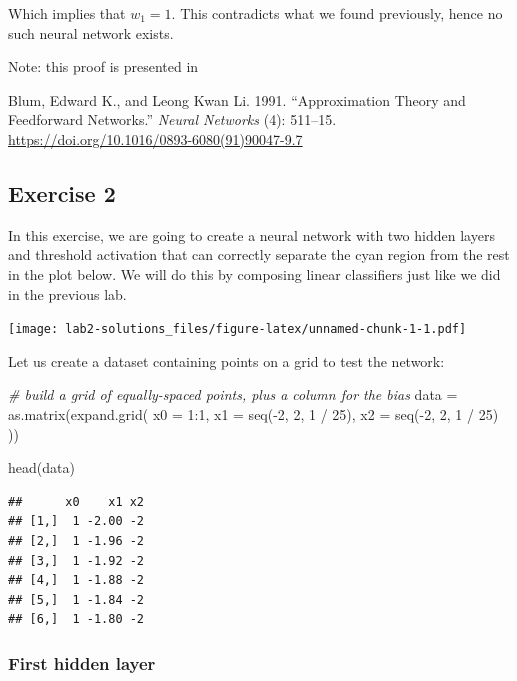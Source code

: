 \documentclass[
]{article}
\newenvironment{Shaded}{\begin{snugshade}}{\end{snugshade}}
\newcommand{\AttributeTok}[1]{\textcolor[rgb]{0.77,0.63,0.00}{#1}}
\newcommand{\CommentTok}[1]{\textcolor[rgb]{0.56,0.35,0.01}{\textit{#1}}}
\newcommand{\DecValTok}[1]{\textcolor[rgb]{0.00,0.00,0.81}{#1}}
\newcommand{\FunctionTok}[1]{\textcolor[rgb]{0.00,0.00,0.00}{#1}}
\newcommand{\NormalTok}[1]{#1}
\newcommand{\OtherTok}[1]{\textcolor[rgb]{0.56,0.35,0.01}{#1}}
\newcommand{\SpecialCharTok}[1]{\textcolor[rgb]{0.00,0.00,0.00}{#1}}
\begin{document}
Which implies that \(w_1=1\). This contradicts what we found previously,
hence no such neural network exists.

Note: this proof is presented in

Blum, Edward K., and Leong Kwan Li. 1991. ``Approximation Theory and
Feedforward Networks.'' \emph{Neural Networks} (4): 511--15.
\url{https://doi.org/10.1016/0893-6080(91)90047-9.7}

\hypertarget{exercise-2}{%
\subsection{Exercise 2}\label{exercise-2}}

In this exercise, we are going to create a neural network with two
hidden layers and threshold activation that can correctly separate the
cyan region from the rest in the plot below. We will do this by
composing linear classifiers just like we did in the previous lab.

\texttt{[image: lab2-solutions\_files/figure-latex/unnamed-chunk-1-1.pdf]}

Let us create a dataset containing points on a grid to test the network:

\begin{Shaded}
\begin{Highlighting}[]
\CommentTok{\# build a grid of equally{-}spaced points, plus a column for the bias}
\NormalTok{data }\OtherTok{=} \FunctionTok{as.matrix}\NormalTok{(}\FunctionTok{expand.grid}\NormalTok{(}
  \AttributeTok{x0 =} \DecValTok{1}\SpecialCharTok{:}\DecValTok{1}\NormalTok{,}
  \AttributeTok{x1 =} \FunctionTok{seq}\NormalTok{(}\SpecialCharTok{{-}}\DecValTok{2}\NormalTok{, }\DecValTok{2}\NormalTok{, }\DecValTok{1} \SpecialCharTok{/} \DecValTok{25}\NormalTok{),}
  \AttributeTok{x2 =} \FunctionTok{seq}\NormalTok{(}\SpecialCharTok{{-}}\DecValTok{2}\NormalTok{, }\DecValTok{2}\NormalTok{, }\DecValTok{1} \SpecialCharTok{/} \DecValTok{25}\NormalTok{)}
\NormalTok{))}

\FunctionTok{head}\NormalTok{(data)}
\end{Highlighting}
\end{Shaded}

\begin{verbatim}
##      x0    x1 x2
## [1,]  1 -2.00 -2
## [2,]  1 -1.96 -2
## [3,]  1 -1.92 -2
## [4,]  1 -1.88 -2
## [5,]  1 -1.84 -2
## [6,]  1 -1.80 -2
\end{verbatim}

\hypertarget{first-hidden-layer}{%
\subsubsection{First hidden layer}\label{first-hidden-layer}}
\end{document}
